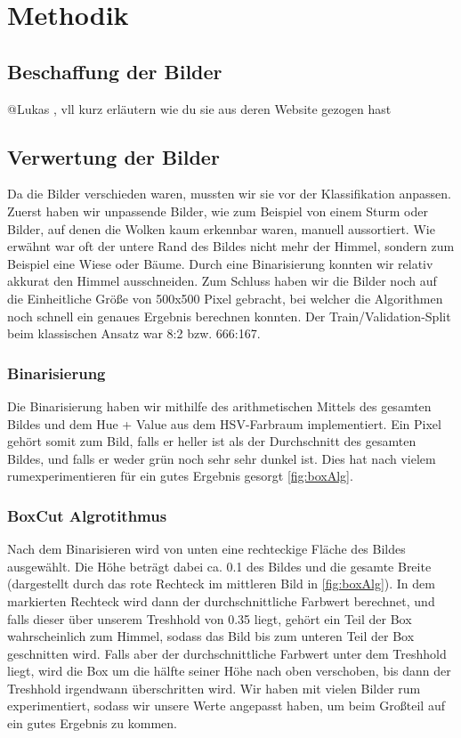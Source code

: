 \documentclass[a4,german]{article}
\begin{document}
\section{Methodik}


\subsection{Beschaffung der Bilder}
@Lukas , vll  kurz erläutern wie du sie aus deren Website gezogen hast

\subsection{Verwertung der Bilder}
Da die Bilder verschieden waren, mussten wir sie vor der Klassifikation anpassen.
Zuerst haben wir unpassende Bilder, wie zum Beispiel von einem Sturm oder Bilder, auf denen die Wolken kaum erkennbar waren, manuell aussortiert.
Wie erwähnt war oft der untere Rand des Bildes nicht mehr der Himmel, sondern zum Beispiel eine Wiese oder Bäume.
Durch eine Binarisierung konnten wir relativ akkurat den Himmel ausschneiden.
Zum Schluss haben wir die Bilder noch auf die Einheitliche Größe von 500x500 Pixel gebracht, bei welcher die Algorithmen noch schnell ein genaues Ergebnis berechnen konnten. Der Train/Validation-Split beim klassischen Ansatz war 8:2 bzw. 666:167.

\subsubsection{Binarisierung}
Die Binarisierung haben wir mithilfe des arithmetischen Mittels des gesamten Bildes und dem Hue + Value aus dem HSV-Farbraum implementiert.
Ein Pixel gehört somit zum Bild, falls er heller ist als der Durchschnitt des gesamten Bildes, und falls er weder grün noch sehr sehr dunkel ist. Dies hat nach vielem rumexperimentieren für ein gutes Ergebnis gesorgt \ref{fig:boxAlg}. 
\subsubsection{BoxCut Algrotithmus}
Nach dem Binarisieren wird von unten eine rechteckige Fläche des Bildes ausgewählt. Die Höhe beträgt dabei ca. 0.1 des Bildes und die gesamte Breite (dargestellt durch das rote Rechteck im mittleren Bild in \ref{fig:boxAlg}). In dem markierten Rechteck wird dann der durchschnittliche Farbwert berechnet, und falls dieser über unserem Treshhold von 0.35 liegt, gehört ein Teil der Box wahrscheinlich zum Himmel, sodass das Bild bis zum unteren Teil der Box geschnitten wird.
Falls aber der durchschnittliche Farbwert unter dem Treshhold liegt, wird die Box um die hälfte seiner Höhe nach oben verschoben, bis dann der Treshhold irgendwann überschritten wird.
Wir haben mit vielen Bilder rum experimentiert, sodass wir unsere Werte angepasst haben, um beim Großteil auf ein gutes Ergebnis zu kommen.
\end{document}
